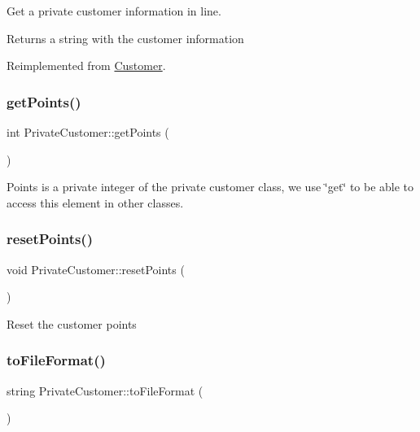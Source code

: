 Get a private customer information in line. \begin{DoxyReturn}{Returns}
a string with the customer information 
\end{DoxyReturn}


Reimplemented from \hyperlink{classCustomer_ae13da50be281b8f266f463a2166cad66}{Customer}.

\hypertarget{classPrivateCustomer_ad8c8c1ff1cf54e6e60d73b7c6806e699}{}\label{classPrivateCustomer_ad8c8c1ff1cf54e6e60d73b7c6806e699} 
\subsubsection{\texorpdfstring{get\+Points()}{getPoints()}}
{\footnotesize\ttfamily int Private\+Customer\+::get\+Points (\begin{DoxyParamCaption}{ }\end{DoxyParamCaption})}

Points is a private integer of the private customer class, we use \char`\"{}get\char`\"{} to be able to access this element in other classes. \hypertarget{classPrivateCustomer_a2e633d2d89e3ce4696e810ddb8c64bd0}{}\label{classPrivateCustomer_a2e633d2d89e3ce4696e810ddb8c64bd0} 
\subsubsection{\texorpdfstring{reset\+Points()}{resetPoints()}}
{\footnotesize\ttfamily void Private\+Customer\+::reset\+Points (\begin{DoxyParamCaption}{ }\end{DoxyParamCaption})}

Reset the customer points \hypertarget{classPrivateCustomer_adb678cbc09d9e4a8e9e4ab0d556b8b6c}{}\label{classPrivateCustomer_adb678cbc09d9e4a8e9e4ab0d556b8b6c} 
\subsubsection{\texorpdfstring{to\+File\+Format()}{toFileFormat()}}
{\footnotesize\ttfamily string Private\+Customer\+::to\+File\+Format (\begin{DoxyParamCaption}{ }\end{DoxyParamCaption})\hspace{0.3cm}{\ttfamily [virtual]}}

